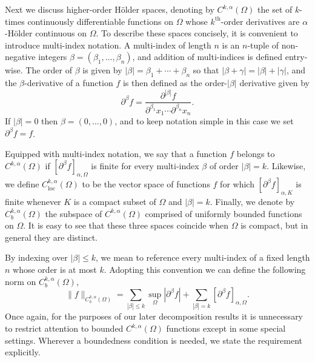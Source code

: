 \documentclass[oneside,hidelinks,indentfirst,10pt]{book}
\begin{document}
Next we discuss higher-order H\"older spaces, denoting by \(C^{k,\alpha}(\Omega)\) the set of \(k\)-times continuously differentiable functions on \(\Omega\) whose \(k^\mathrm{th}\)-order derivatives are \(\alpha\)-H\"older continuous on \(\Omega\). To describe these spaces concisely, it is convenient to introduce multi-index notation. A multi-index of length \(n\) is an \(n\)-tuple of non-negative integers \(\beta=(\beta_1,\dots,\beta_n)\), and addition of multi-indices is defined entry-wise. The order of \(\beta\) is given by \(|\beta|=\beta_1+\cdots+\beta_n\) so that \(|\beta+\gamma|=|\beta|+|\gamma|\), and the \(\beta\)-derivative of a function \(f\) is then defined as the order-\(|\beta|\) derivative given by
\[
    \partial^\beta f=\frac{\partial^{|\beta| }f}{\partial^{\beta_1}x_1\cdots\partial^{\beta_n}x_n}.
\]
If \(|\beta|=0\) then \(\beta=(0,\dots,0)\), and to keep notation simple in this case we set \(\partial^\beta f=f\). 


Equipped with multi-index notation, we say that a function \(f\) belongs to \(C^{k,\alpha}(\Omega)\) if \([\partial^\beta f]_{\alpha,\Omega}\) is finite for every multi-index \(\beta\) of order \(|\beta|=k\). Likewise, we define \(C^{k,\alpha}_\mathrm{loc}(\Omega)\) to be the vector space of functions \(f\) for which \([\partial^\beta f]_{\alpha,K}\) is finite whenever \(K\) is a compact subset of \(\Omega\) and \(|\beta|=k\). Finally, we denote by \(C_b^{k,\alpha}(\Omega)\) the subspace of \(C^{k,\alpha}(\Omega)\) comprised of uniformly bounded functions on \(\Omega\). It is easy to see that these three spaces coincide when \(\Omega\) is compact, but in general they are distinct.


By indexing over \(|\beta|\leq k\), we mean to reference every multi-index of a fixed length \(n\) whose order is at most \(k\). Adopting this convention we can define the following norm on \(C_b^{k,\alpha}(\Omega)\),
\begin{equation}\label{eq:holdernorm}
    \|f\|_{C^{k,\alpha}_b(\Omega)}=\sum_{|\beta|\leq k}\sup_\Omega|\partial^\beta f|+\sum_{|\beta|=k}[\partial^\beta f]_{\alpha,\Omega}.
\end{equation}
Once again, for the purposes of our later decomposition results it is unnecessary to restrict attention to bounded \(C^{k,\alpha}(\Omega)\) functions except in some special settings. Wherever a boundedness condition is needed, we state the requirement explicitly.
\end{document}
